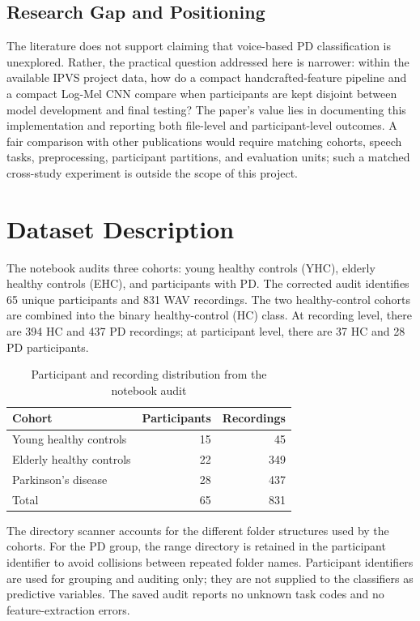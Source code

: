 \documentclass[conference]{IEEEtran}
\begin{document}
\subsection{Research Gap and Positioning}
The literature does not support claiming that voice-based PD classification is unexplored. Rather, the practical question addressed here is narrower: within the available IPVS project data, how do a compact handcrafted-feature pipeline and a compact Log-Mel CNN compare when participants are kept disjoint between model development and final testing? The paper's value lies in documenting this implementation and reporting both file-level and participant-level outcomes. A fair comparison with other publications would require matching cohorts, speech tasks, preprocessing, participant partitions, and evaluation units; such a matched cross-study experiment is outside the scope of this project.

\section{Dataset Description}
The notebook audits three cohorts: young healthy controls (YHC), elderly healthy controls (EHC), and participants with PD. The corrected audit identifies 65 unique participants and 831 WAV recordings. The two healthy-control cohorts are combined into the binary healthy-control (HC) class. At recording level, there are 394 HC and 437 PD recordings; at participant level, there are 37 HC and 28 PD participants.

\begin{table}[!t]
\centering
\caption{Participant and recording distribution from the notebook audit}
\label{tab:dataset}
\begin{tabular}{lrr}
\toprule
Cohort & Participants & Recordings\\
\midrule
Young healthy controls & 15 & 45\\
Elderly healthy controls & 22 & 349\\
Parkinson's disease & 28 & 437\\
\midrule
Total & 65 & 831\\
\bottomrule
\end{tabular}
\end{table}

The directory scanner accounts for the different folder structures used by the cohorts. For the PD group, the range directory is retained in the participant identifier to avoid collisions between repeated folder names. Participant identifiers are used for grouping and auditing only; they are not supplied to the classifiers as predictive variables. The saved audit reports no unknown task codes and no feature-extraction errors.
\end{document}
